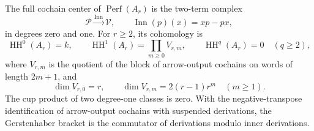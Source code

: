 \begin{theorem}\label{cbc:rc:mpc:thm:centre}
The full cochain center of \(\operatorname{Perf}(A_r)\) is the
two-term complex
\begin{equation}\label{cbc:rc:mpc:eq:centre-complex}
 \mathcal P\xrightarrow{\operatorname{Inn}}\mathcal V,
 \qquad \operatorname{Inn}(p)(x)=xp-px,
\end{equation}
in degrees zero and one.  For \(r\geq2\), its cohomology is
\[
 \operatorname{HH}^0(A_r)=k,\qquad
 \operatorname{HH}^1(A_r)=\prod_{m\geq0}V_{r,m},\qquad
 \operatorname{HH}^q(A_r)=0\quad(q\geq2),
\]
where \(V_{r,m}\) is the quotient of the block of arrow-output
cochains on words of length \(2m+1\), and
\begin{equation}\label{cbc:rc:mpc:eq:dimensions}
 \dim V_{r,0}=r,\qquad
 \dim V_{r,m}=2(r-1)r^m\quad(m\geq1).
\end{equation}
The cup product of two degree-one classes is zero.  With the
negative-transpose identification of arrow-output cochains with
suspended derivations, the Gerstenhaber bracket is the commutator
of derivations modulo inner derivations.
\end{theorem}

